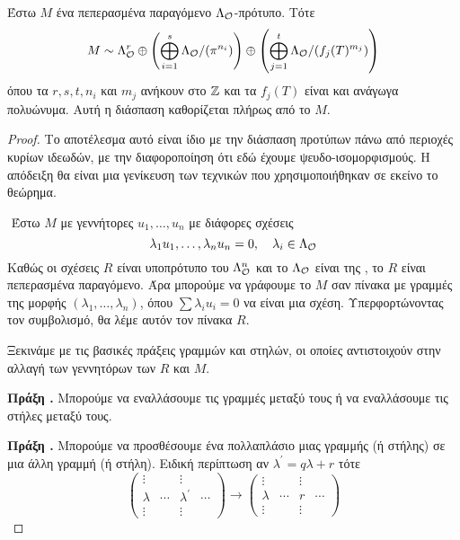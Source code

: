 \begin{theorem}
    Έστω $M$ ένα πεπερασμένα παραγόμενο $\Lambda_\mathcal{O}$-πρότυπο. Τότε
    $$M \sim \Lambda_\mathcal{O}^r \oplus \left(\bigoplus\limits_{i=1}^s \Lambda_\mathcal{O}/(\pi^{n_i})\right) \oplus \left( \bigoplus\limits_{j=1}^t \Lambda_\mathcal{O}/(f_j(T)^{m_j})\right)$$ όπου τα $r,s,t,n_i$ και $m_j$ ανήκουν στο $\mathbb{Z}$ και τα $f_j(T)$ είναι  και ανάγωγα πολυώνυμα. Αυτή η διάσπαση καθορίζεται πλήρως από το $M$.
\end{theorem}

\begin{proof}
Το αποτέλεσμα αυτό είναι ίδιο με την διάσπαση προτύπων πάνω από περιοχές κυρίων ιδεωδών, με την διαφοροποίηση ότι εδώ έχουμε ψευδο-ισομορφισμούς. Η απόδειξη θα είναι μια γενίκευση των τεχνικών που χρησιμοποιήθηκαν σε εκείνο το θεώρημα.

$ $\newline
Έστω $M$ με γεννήτορες $u_1,\ldots,u_n$ με διάφορες σχέσεις
$$\lambda_1 u_1,\ldots, \lambda_n u_n = 0, \quad \lambda_i \in \Lambda_\mathcal{O}$$
\noindent Καθώς οι σχέσεις $R$ είναι υποπρότυπο του $\Lambda_\mathcal{O}^n$ και το $\Lambda_\mathcal{O}$ είναι της , το $R$ είναι πεπερασμένα παραγόμενο. Άρα μπορούμε να γράφουμε το $M$ σαν πίνακα με γραμμές της μορφής $(\lambda_1,\ldots, \lambda_n)$, όπου $\sum \lambda_i u_i = 0$ να είναι μια σχέση. Υπερφορτώνοντας τον συμβολισμό, θα λέμε αυτόν τον πίνακα $R$.

\noindent Ξεκινάμε με τις βασικές πράξεις γραμμών και στηλών, οι οποίες αντιστοιχούν στην αλλαγή των γεννητόρων των $R$ και $M$.

\noindent \textbf{Πράξη .} Μπορούμε να εναλλάσουμε τις γραμμές μεταξύ τους ή να εναλλάσουμε τις στήλες μεταξύ τους.

\noindent \textbf{Πράξη .} Μπορούμε να προσθέσουμε ένα πολλαπλάσιο μιας γραμμής (ή στήλης) σε μια άλλη γραμμή (ή στήλη). Ειδική περίπτωση αν $\lambda^\prime = q\lambda +r$ τότε
$$\begin{pmatrix}
    \vdots & & \vdots & \\
    \lambda & \cdots & \lambda^\prime & \cdots \\
    \vdots & & \vdots & 
\end{pmatrix} \longrightarrow \begin{pmatrix}
    \vdots & & \vdots & \\
    \lambda & \cdots & r & \cdots \\
    \vdots & & \vdots &
\end{pmatrix}$$


\end{proof}

